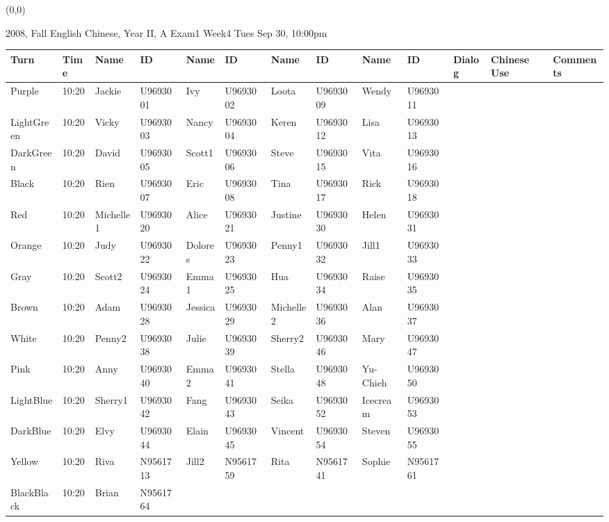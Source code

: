 \documentclass[a4paper]{article}
\begin{document}
\begin{textblock}{15}(0,0)
\begin{minipage}{20cm}
\large
\begin{Large}2008, Fall English Chinese, Year II, A Exam1 Week4 Tues Sep 30, 10:00pm\end{Large}
\par
\begin{tabular}[t]{|p{1.5cm}|p{0.8cm}|p{1.1cm}|p{1.8cm}|p{1.1cm}|p{1.8cm}|p{1.1cm}|p{1.8cm}|p{1.1cm}|p{1.8cm}|p{0.9cm}|p{3.0cm}|p{2.5cm}|}
\hline
 Turn & Time & Name & ID & Name & ID & Name & ID & Name & ID & Dialog & Chinese Use & Comments \\ \hline
\hline

Purple	&10:20& Jackie	&U9693001	&Ivy	&U9693002	&Loota	&U9693009	&Wendy	&U9693011	& & & \\ \hline
LightGreen	&10:20& Vicky	&U9693003	&Nancy	&U9693004	&Keren	&U9693012	&Lisa	&U9693013	& & & \\ \hline
DarkGreen	&10:20& David	&U9693005	&Scott1	&U9693006	&Steve	&U9693015	&Vita	&U9693016	& & & \\ \hline
Black	&10:20& Rien	&U9693007	&Eric	&U9693008	&Tina	&U9693017	&Rick	&U9693018	& & & \\ \hline
Red	&10:20& Michelle1	&U9693020	&Alice	&U9693021	&Justine	&U9693030	&Helen	&U9693031	& & & \\ \hline
Orange	&10:20& Judy	&U9693022	&Dolores	&U9693023	&Penny1	&U9693032	&Jill1	&U9693033	& & & \\ \hline
Gray	&10:20& Scott2	&U9693024	&Emma1	&U9693025	&Hua	&U9693034	&Raise	&U9693035	& & & \\ \hline
Brown	&10:20& Adam	&U9693028	&Jessica	&U9693029	&Michelle2	&U9693036	&Alan	&U9693037	& & & \\ \hline
White	&10:20& Penny2	&U9693038	&Julie	&U9693039	&Sherry2	&U9693046	&Mary	&U9693047	& & & \\ \hline
Pink	&10:20& Anny	&U9693040	&Emma2	&U9693041	&Stella	&U9693048	&Yu-Chieh	&U9693050	& & & \\ \hline
LightBlue	&10:20& Sherry1	&U9693042	&Fang	&U9693043	&Seika	&U9693052	&Icecream	&U9693053	& & & \\ \hline
DarkBlue	&10:20& Elvy	&U9693044	&Elain	&U9693045	&Vincent	&U9693054	&Steven	&U9693055	& & & \\ \hline
Yellow	&10:20& Riva	&N9561713	&Jill2	&N9561759	&Rita	&N9561741	&Sophie	&N9561761	& & & \\ \hline
BlackBlack	&10:20& Brian	&N9561764 & & & & & & & & & \\ \hline
\hline
\end{tabular}
\end{minipage}
\end{textblock}
\end{document}
